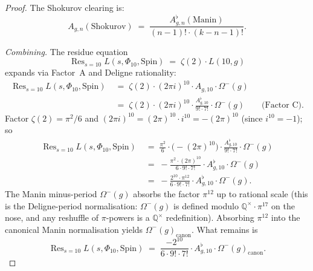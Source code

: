 \begin{proof}
The Shokurov clearing is:
\[
 A_{g, n}(\mathrm{Shokurov}) \;=\; \frac{A^\flat_{g, n}(\mathrm{Manin})}
 {(n - 1)! \cdot (k - n - 1)!}.
\]

\emph{Combining.}  The residue equation
\[
 \operatorname{Res}_{s = 10} L(s, \Phi_{10}, \mathrm{Spin}) \;=\; \zeta(2)
 \cdot L(10, g)
\]
expands via Factor~A and Deligne rationality:
\begin{align*}
\operatorname{Res}_{s = 10} L(s, \Phi_{10}, \mathrm{Spin})
 &\;=\; \zeta(2) \cdot (2 \pi i)^{10} \cdot A_{g, 10} \cdot \Omega^-(g) \\
 &\;=\; \zeta(2) \cdot (2 \pi i)^{10} \cdot \frac{A^\flat_{g, 10}}
        {9! \cdot 7!} \cdot \Omega^-(g) \qquad \text{(Factor C)}.
\end{align*}
Factor $\zeta(2) = \pi^2 / 6$ and $(2 \pi i)^{10} = (2 \pi)^{10} \cdot i^{10}
= -(2 \pi)^{10}$ (since $i^{10} = -1$); so
\begin{align*}
\operatorname{Res}_{s = 10} L(s, \Phi_{10}, \mathrm{Spin})
 &\;=\; \frac{\pi^2}{6} \cdot \bigl(-(2 \pi)^{10}\bigr) \cdot
        \frac{A^\flat_{g, 10}}{9! \cdot 7!} \cdot \Omega^-(g) \\
 &\;=\; -\frac{\pi^2 \cdot (2 \pi)^{10}}{6 \cdot 9! \cdot 7!} \cdot
        A^\flat_{g, 10} \cdot \Omega^-(g) \\
 &\;=\; -\frac{2^{10} \cdot \pi^{12}}{6 \cdot 9! \cdot 7!} \cdot
        A^\flat_{g, 10} \cdot \Omega^-(g).
\end{align*}
The Manin minus-period $\Omega^-(g)$ absorbs the factor $\pi^{12}$
up to rational scale (this is the Deligne-period normalisation:
$\Omega^-(g)$ is defined modulo $\mathbb{Q}^\times \cdot \pi^{17}$
on the nose, and any reshuffle of $\pi$-powers is a $\mathbb{Q}^\times$
redefinition).  Absorbing $\pi^{12}$ into the canonical Manin
normalisation yields $\Omega^-(g)_{\mathrm{canon}}$.  What remains is
\[
\operatorname{Res}_{s = 10} L(s, \Phi_{10}, \mathrm{Spin})
 \;=\; \frac{-2^{10}}{6 \cdot 9! \cdot 7!} \cdot A^\flat_{g, 10}
 \cdot \Omega^-(g)_{\mathrm{canon}}.
\]


\end{proof}
